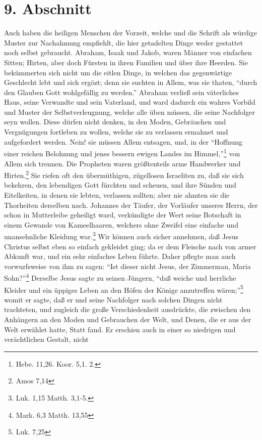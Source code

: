 \section{9. Abschnitt}

Auch haben die heiligen Menschen der Vorzeit, welche und die Schrift als würdige
Muster zur Nachahmung empfiehlt, die hier getadelten Dinge weder gestattet noch
selbst gebraucht. Abraham, Isaak und Jakob, waren Männer von einfachen Sitten;
Hirten, aber doch Fürsten in ihren Familien und über ihre Heerden. Sie
bekümmerten sich nicht um die eitlen Dinge, in welchen das gegenwärtige
Geschlecht lebt und sich ergözt; denn sie suchten in Allem, was sie thaten,
"`durch den Glauben Gott wohlgefällig zu werden."' Abraham verließ sein
väterliches Haus, seine Verwandte und sein Vaterland, und ward dadurch ein
wahres Vorbild und Muster der Selbstverleugnung, welche alle üben müssen, die
seine Nachfolger seyn wollen. Diese dürfen nicht denken, in den Moden,
Gebräuchen und Vergnügungen fortleben zu wollen, welche sie zu verlassen
ermahnet und aufgefordert werden. Nein! sie müssen Allem entsagen, und, in der
"`Hoffnung einer reichen Belohnung und jenes bessern ewigen Landes im
Himmel,"'\footnote{Hebe. 11,26. Koor. 5,1. 2.} von Allem sich trennen. Die
Propheten waren größtenteils arme Handwerker und Hirten.\footnote{Amos 7,14} Sie
riefen oft den übermüthigen, zügellosen Israeliten zu, daß sie sich bekehren,
den lebendigen Gott fürchten und scheuen, und ihre Sünden und Eitelkeiten, in
denen sie lebten, verlassen sollten; aber nie ahmten sie die Thorheiten
derselben nach. Johannes der Täufer, der Vorläufer unseres Herrn, der schon in
Mutterleibe geheiligt ward, verkündigte der Wert seine Botschaft in einem
Gewande von Kameelhaaren, welchers ohne Zweifel eine einfache und unansehnliche
Kleidung war.\footnote{Luk. 1,15 Matth. 3,1-5.} Wir können auch sicher annehmen,
daß Jesus Christus selbst eben so einfach gekleidet ging; da er dem Fleische
nach von armer Abkunft war, und ein sehr einfaches Leben führte. Daher pflegte
man auch vorwurfsweise von ihm zu sagen: "`Ist dieser nicht Jesus, der
Zimmerman, Maria Sohn?"'\footnote{Mark. 6,3 Matth. 13,55} Derselbe Jesus sagte
zu seinen Jüngern, "`daß weiche und herrliche Kleider und ein üppiges Leben an
den Höfen der Könige anzutreffen wären;"'\footnote{Luk. 7,25} womit er sagte,
daß er und seine Nachfolger nach solchen Dingen nicht trachteten, und zugleich
die große Verschiedenheit ausdrückte, die zwischen den Anhängern an den Moden
und Gebrauchen der Welt, und Denen, die er aus der Welt erwählet hatte, Statt
fand. Er erschien auch in einer so niedrigen und verächtlichen Gestalt, nicht
